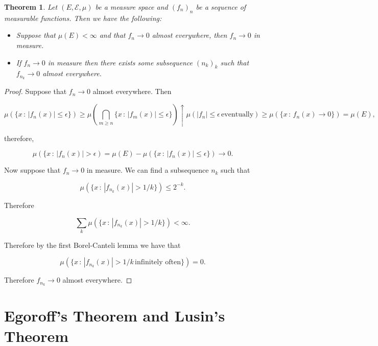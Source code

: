 \documentclass[
]{book}
\providecommand{\tightlist}{%
  \setlength{\itemsep}{0pt}\setlength{\parskip}{0pt}}
\newtheorem{theorem}{Theorem}[chapter]
\theoremstyle{definition}
\theoremstyle{definition}
\theoremstyle{definition}
\theoremstyle{definition}
\theoremstyle{remark}
\begin{document}
\begin{theorem}

Let \((E, \mathcal{E}, \mu)\) be a measure space and \((f_n)_n\) be a sequence of measurable functions. Then we have the following:

\begin{itemize}
\tightlist
\item
  Suppose that \(\mu(E) < \infty\) and that \(f_n \rightarrow 0\) almost everywhere, then \(f_n \rightarrow 0\) in measure.
\item
  If \(f_n \rightarrow 0\) in measure then there exists some subsequence \((n_k)_k\) such that \(f_{n_k} \rightarrow 0\) almost everywhere.
\end{itemize}

\end{theorem}

\begin{proof}
Suppose that \(f_n \rightarrow 0\) almost everywhere. Then

\[ \mu(\{ x\,:\, |f_n(x)| \leq \epsilon \}) \geq \mu \left( \bigcap_{m \geq n} \{ x \,:\, |f_m(x)| \leq \epsilon\}\right) \uparrow \mu \left(|f_n| \leq \epsilon \, \mbox{eventually} \right) \geq \mu(\{ x \,:\, f_n(x) \rightarrow 0\}) = \mu(E), \]

therefore,

\[ \mu(\{ x\,:\, |f_n(x)|> \epsilon) = \mu(E) - \mu(\{ x\,:\, |f_n(x)| \leq \epsilon \}) \rightarrow 0. \]

Now suppose that \(f_n \rightarrow 0\) in measure. We can find a subsequence \(n_k\) such that

\[ \mu(\{ x \,:\, |f_{n_k}(x)| > 1/k \}) \leq 2^{-k}. \]

Therefore

\[ \sum_k \mu(\{ x \,:\, |f_{n_k}(x)| > 1/k \})<\infty.\]

Therefore by the first Borel-Canteli lemma we have that

\[ \mu \left(\{ x\,:\, |f_{n_k}(x)|>1/k \, \mbox{infinitely often}\} \right) = 0. \]

Therefore \(f_{n_k} \rightarrow 0\) almost everywhere.
\end{proof}

\hypertarget{egoroffs-theorem-and-lusins-theorem}{%
\section{Egoroff's Theorem and Lusin's Theorem}\label{egoroffs-theorem-and-lusins-theorem}}
\end{document}
